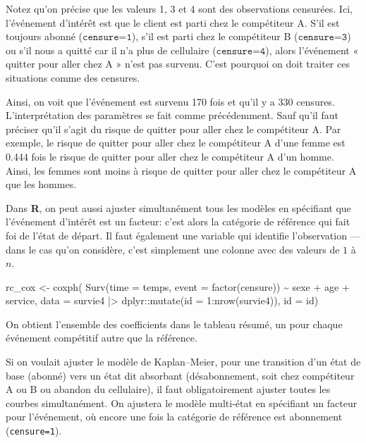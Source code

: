 \documentclass[
  11pt,
  letterpaper,
]{scrbook}
\newenvironment{Shaded}{\begin{snugshade}}{\end{snugshade}}
\newcommand{\AttributeTok}[1]{\textcolor[rgb]{0.40,0.45,0.13}{#1}}
\newcommand{\DecValTok}[1]{\textcolor[rgb]{0.68,0.00,0.00}{#1}}
\newcommand{\FunctionTok}[1]{\textcolor[rgb]{0.28,0.35,0.67}{#1}}
\newcommand{\NormalTok}[1]{\textcolor[rgb]{0.00,0.23,0.31}{#1}}
\newcommand{\OtherTok}[1]{\textcolor[rgb]{0.00,0.23,0.31}{#1}}
\newcommand{\SpecialCharTok}[1]{\textcolor[rgb]{0.37,0.37,0.37}{#1}}
\theoremstyle{definition}
\theoremstyle{remark}
\begin{document}
Notez qu'on précise que les valeurs 1, 3 et 4 sont des observations
censurées. Ici, l'événement d'intérêt est que le client est parti chez
le compétiteur A. S'il est toujours abonné (\(\texttt{censure=1}\)),
s'il est parti chez le compétiteur B (\(\texttt{censure=3}\)) ou s'il
nous a quitté car il n'a plus de cellulaire (\(\texttt{censure=4}\)),
alors l'événement « quitter pour aller chez A » n'est pas survenu. C'est
pourquoi on doit traiter ces situations comme des censures.

Ainsi, on voit que l'événement est survenu 170 fois et qu'il y a 330
censures. L'interprétation des paramètres se fait comme précédemment.
Sauf qu'il faut préciser qu'il s'agit du risque de quitter pour aller
chez le compétiteur A. Par exemple, le risque de quitter pour aller chez
le compétiteur A d'une femme est 0.444 fois le risque de quitter pour
aller chez le compétiteur A d'un homme. Ainsi, les femmes sont moins à
risque de quitter pour aller chez le compétiteur A que les hommes.

Dans \textbf{R}, on peut aussi ajuster simultanément tous les modèles en
spécifiant que l'événement d'intérêt est un facteur: c'est alors la
catégorie de référence qui fait foi de l'état de départ. Il faut
également une variable qui identifie l'observation --- dans le cas qu'on
considère, c'est simplement une colonne avec des valeurs de \(1\) à
\(n\).

\begin{Shaded}
\begin{Highlighting}[]
\NormalTok{rc\_cox }\OtherTok{\textless{}{-}} \FunctionTok{coxph}\NormalTok{(}
  \FunctionTok{Surv}\NormalTok{(}\AttributeTok{time =}\NormalTok{ temps, }
       \AttributeTok{event =} \FunctionTok{factor}\NormalTok{(censure)) }\SpecialCharTok{\textasciitilde{}}\NormalTok{ sexe }\SpecialCharTok{+}\NormalTok{ age }\SpecialCharTok{+}\NormalTok{ service,}
  \AttributeTok{data =}\NormalTok{ survie4 }\SpecialCharTok{|\textgreater{}}
\NormalTok{    dplyr}\SpecialCharTok{::}\FunctionTok{mutate}\NormalTok{(}\AttributeTok{id =} \DecValTok{1}\SpecialCharTok{:}\FunctionTok{nrow}\NormalTok{(survie4)),}
  \AttributeTok{id =}\NormalTok{ id)}
\end{Highlighting}
\end{Shaded}

On obtient l'ensemble des coefficients dans le tableau résumé, un pour
chaque événement compétitif autre que la référence.

Si on voulait ajuster le modèle de Kaplan--Meier, pour une transition
d'un état de base (abonné) vers un état dit absorbant (désabonnement,
soit chez compétiteur A ou B ou abandon du cellulaire), il faut
obligatoirement ajuster toutes les courbes simultanément. On ajustera le
modèle multi-état en spécifiant un facteur pour l'événement, où encore
une fois la catégorie de référence est abonnement (\texttt{censure=1}).
\end{document}
